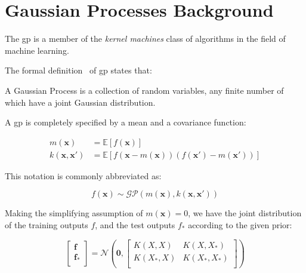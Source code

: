 \section{Gaussian Processes Background}\label{sec:gaussian_processes}

The \acrfull{gp} is a member of the \textit{kernel machines} class of algorithms
in the field of machine learning.

The formal definition~\cite{rasmussenGaussianProcessesMachine2006} of
\acrlong{gp} states that:


\begin{displayquote}
    A Gaussian Process is a collection of random variables, any finite number of
    which have a joint Gaussian distribution.
\end{displayquote}

A \acrshort{gp} is completely specified by a mean and a covariance function:

\begin{equation}
    \begin{aligned}
        m(\mathbf{x}) &= \mathbb{E}[f(\mathbf{x})] \\
        k(\mathbf{x}, \mathbf{x'}) &= \mathbb{E}[f(\mathbf{x} -
        m(\mathbf{x}))(f(\mathbf{x'}) - m(\mathbf{x'}))]
    \end{aligned}
\end{equation}

This notation is commonly abbreviated as:

\begin{equation}
    f(\mathbf{x}) \sim \mathcal{GP}(m(\mathbf{x}), k(\mathbf{x}, \mathbf{x'}))
\end{equation}

Making the simplifying assumption of $m(\mathbf{x}) = 0$, we have the joint
distribution of the training outputs $f$, and the test outputs $f_*$ according
to the given prior:

\begin{equation}
    \begin{bmatrix}
        \mathbf{f} \\
        \mathbf{f_*} \\
    \end{bmatrix} = 
    \mathcal{N}\left(
        \mathbf{0}, 
        \begin{bmatrix}
            K(X, X) & K(X, X_*) \\
            K(X_*, X) & K(X_*, X_*) \\
        \end{bmatrix}
    \right)
\end{equation}

